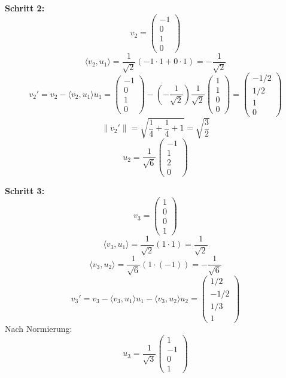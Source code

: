 \documentclass{article}
\begin{document}
\textbf{Schritt 2:}
$$v_2 = \begin{pmatrix} -1 \\ 0 \\ 1 \\ 0 \end{pmatrix}$$
$$\langle v_2, u_1 \rangle = \frac{1}{\sqrt{2}}(-1 \cdot 1 + 0 \cdot 1) = -\frac{1}{\sqrt{2}}$$
$$v_2' = v_2 - \langle v_2, u_1 \rangle u_1 = \begin{pmatrix} -1 \\ 0 \\ 1 \\ 0 \end{pmatrix} - \left(-\frac{1}{\sqrt{2}}\right) \frac{1}{\sqrt{2}}\begin{pmatrix} 1 \\ 1 \\ 0 \\ 0 \end{pmatrix} = \begin{pmatrix} -1/2 \\ 1/2 \\ 1 \\ 0 \end{pmatrix}$$
$$\|v_2'\| = \sqrt{\frac{1}{4} + \frac{1}{4} + 1} = \sqrt{\frac{3}{2}}$$
$$u_2 = \frac{1}{\sqrt{6}}\begin{pmatrix} -1 \\ 1 \\ 2 \\ 0 \end{pmatrix}$$

\textbf{Schritt 3:}
$$v_3 = \begin{pmatrix} 1 \\ 0 \\ 0 \\ 1 \end{pmatrix}$$
$$\langle v_3, u_1 \rangle = \frac{1}{\sqrt{2}}(1 \cdot 1) = \frac{1}{\sqrt{2}}$$
$$\langle v_3, u_2 \rangle = \frac{1}{\sqrt{6}}(1 \cdot (-1)) = -\frac{1}{\sqrt{6}}$$
$$v_3' = v_3 - \langle v_3, u_1 \rangle u_1 - \langle v_3, u_2 \rangle u_2 = \begin{pmatrix} 1/2 \\ -1/2 \\ 1/3 \\ 1 \end{pmatrix}$$
Nach Normierung:
$$u_3 = \frac{1}{\sqrt{3}}\begin{pmatrix} 1 \\ -1 \\ 0 \\ 1 \end{pmatrix}$$
\end{document}
